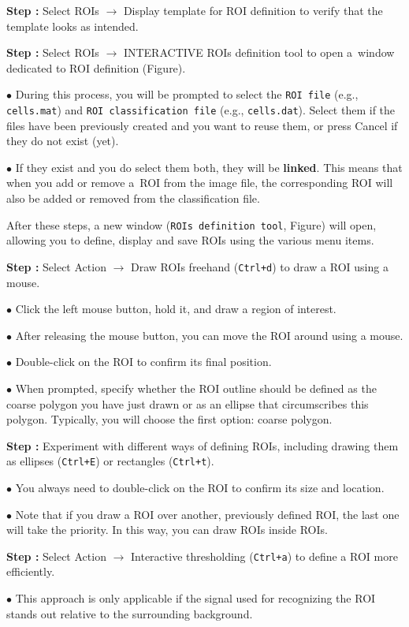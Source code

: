 \documentclass[a4paper, 11pt]{article}
\newcommand{\ttt}[1]{\texttt{#1}}
\newcommand{\lans}[1]{{\color{magenta}#1}}
\newcommand\ra{\rightarrow}
\newcounter{step}
\newcommand\s{\addtocounter{step}{1}\noindent\textbf{Step \thestep:}{ }}
\newcommand\bul{\noindent$\bullet${ }}
\newcommand\bb[1]{\textbf{#1}}
\begin{document}
\s Select \lans{ROIs} $\ra$ \lans{Display template for ROI definition} to verify that the template looks as intended. 

\s Select \lans{ROIs} $\ra$ \lans{INTERACTIVE ROIs definition tool} to open a~window dedicated to ROI definition (Figure). 

\bul During this process, you will be prompted to select the \ttt{ROI file} (e.g., \ttt{cells.mat}) and \ttt{ROI classification file} (e.g., \ttt{cells.dat}). Select them if the files have been previously created and you want to reuse them, or press \lans{Cancel} if they do not exist (yet).

\bul If they exist and you do select them both, they will be \bb{linked}. This means that when you add or remove a~ROI from the image file, the corresponding ROI will also be added or removed from the classification file.

After these steps, a new window (\ttt{ROIs definition tool}, Figure) will open, allowing you to define, display and save ROIs using the various menu items.

\setcounter{step}{0}

\s Select \lans{Action} $\ra$ \lans{Draw ROIs freehand} (\ttt{Ctrl+d}) to draw a ROI using a mouse.

\bul Click the left mouse button, hold it, and draw a region of interest. 

\bul After releasing the mouse button, you can move the ROI around using a mouse. 

\bul Double-click on the ROI to confirm its final position.

\bul When prompted, specify whether the ROI outline should be defined as the \lans{coarse polygon} you have just drawn or as an \lans{ellipse that circumscribes} this polygon. Typically, you will choose the first option: coarse polygon.

\s Experiment with different ways of defining ROIs, including drawing them as \lans{ellipses} (\ttt{Ctrl+E}) or \lans{rectangles} (\ttt{Ctrl+t}).

\bul You always need to double-click on the ROI to confirm its size and location.

\bul Note that if you draw a ROI over another, previously defined ROI, the last one will take the priority. In this way, you can draw ROIs inside ROIs.

\s Select \lans{Action} $\ra$ \lans{Interactive thresholding} (\ttt{Ctrl+a}) to define a ROI more efficiently. 

\bul This approach is only applicable if the signal used for recognizing the ROI stands out relative to the surrounding background.
\end{document}
